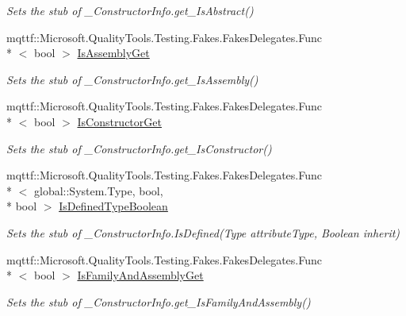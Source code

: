 \begin{DoxyCompactItemize}
\begin{DoxyCompactList}\small\item\em Sets the stub of \-\_\-\-Constructor\-Info.\-get\-\_\-\-Is\-Abstract()\end{DoxyCompactList}\item 
mqttf\-::\-Microsoft.\-Quality\-Tools.\-Testing.\-Fakes.\-Fakes\-Delegates.\-Func\\*
$<$ bool $>$ \hyperlink{class_system_1_1_runtime_1_1_interop_services_1_1_fakes_1_1_stub___constructor_info_a095bcb186eb9fb934e844b01852b020b}{Is\-Assembly\-Get}
\begin{DoxyCompactList}\small\item\em Sets the stub of \-\_\-\-Constructor\-Info.\-get\-\_\-\-Is\-Assembly()\end{DoxyCompactList}\item 
mqttf\-::\-Microsoft.\-Quality\-Tools.\-Testing.\-Fakes.\-Fakes\-Delegates.\-Func\\*
$<$ bool $>$ \hyperlink{class_system_1_1_runtime_1_1_interop_services_1_1_fakes_1_1_stub___constructor_info_aed677457a49dabe6784d0d98ca2bed2a}{Is\-Constructor\-Get}
\begin{DoxyCompactList}\small\item\em Sets the stub of \-\_\-\-Constructor\-Info.\-get\-\_\-\-Is\-Constructor()\end{DoxyCompactList}\item 
mqttf\-::\-Microsoft.\-Quality\-Tools.\-Testing.\-Fakes.\-Fakes\-Delegates.\-Func\\*
$<$ global\-::\-System.\-Type, bool, \\*
bool $>$ \hyperlink{class_system_1_1_runtime_1_1_interop_services_1_1_fakes_1_1_stub___constructor_info_a8cc58e858fd7fac4cccdbeef4a57d30c}{Is\-Defined\-Type\-Boolean}
\begin{DoxyCompactList}\small\item\em Sets the stub of \-\_\-\-Constructor\-Info.\-Is\-Defined(\-Type attribute\-Type, Boolean inherit)\end{DoxyCompactList}\item 
mqttf\-::\-Microsoft.\-Quality\-Tools.\-Testing.\-Fakes.\-Fakes\-Delegates.\-Func\\*
$<$ bool $>$ \hyperlink{class_system_1_1_runtime_1_1_interop_services_1_1_fakes_1_1_stub___constructor_info_a282a09d11f124bc874756724e5be53ee}{Is\-Family\-And\-Assembly\-Get}
\begin{DoxyCompactList}\small\item\em Sets the stub of \-\_\-\-Constructor\-Info.\-get\-\_\-\-Is\-Family\-And\-Assembly()\end{DoxyCompactList}\item 

\end{DoxyCompactItemize}
